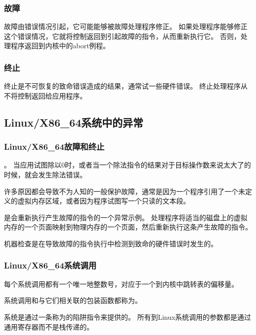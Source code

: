 {{        \subsubsection{故障}
        {
            故障由错误情况引起，它可能能够被故障处理程序修正。
            如果处理程序能够修正这个错误情况，它就将控制返回到引起故障的指令，从而重新执行它。
            否则，处理程序返回到内核中的abort例程。
        }

        \subsubsection{终止}
        {
            终止是不可恢复的致命错误造成的结果，通常试一些硬件错误。
            终止处理程序从不将控制返回给应用程序。
        }
    }

    \subsection{Linux/X86\_64系统中的异常}
    {
        \subsubsection{Linux/X86\_64故障和终止}
        {
            。
            当应用试图除以0时，或者当一个除法指令的结果对于目标操作数来说太大了的时候，就会发生除法错误。

            许多原因都会导致不为人知的一般保护故障，通常是因为一个程序引用了一个未定义的虚拟内存区域，或者因为程序试图写一个只读的文本段。

            是会重新执行产生故障的指令的一个异常示例。
            处理程序将适当的磁盘上的虚拟内存的一个页面映射到物理内存的一个页面，然后重新执行这条产生故障的指令。

            机器检查是在导致故障的指令执行中检测到致命的硬件错误时发生的。
        }

        \subsubsection{Linux/X86\_64系统调用}
        {
            每个系统调用都有一个唯一地整数号，对应于一个到内核中跳转表的偏移量。

            系统调用和与它们相关联的包装函数都称为。

            系统是通过一条称为的陷阱指令来提供的。
            所有到Linux系统调用的参数都是通过通用寄存器而不是栈传递的。
        }
    }
}
